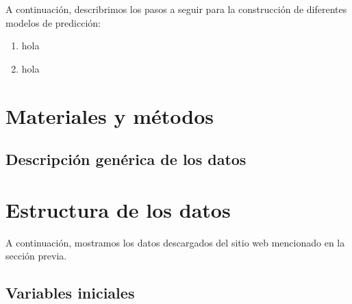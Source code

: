 \documentclass[
  letterpaper,
  DIV=11,
  numbers=noendperiod]{scrartcl}
\providecommand{\tightlist}{%
  \setlength{\itemsep}{0pt}\setlength{\parskip}{0pt}}\usepackage{longtable,booktabs,array}
\begin{document}
A continuación, describrimos los pasos a seguir para la construcción de
diferentes modelos de predicción:

\begin{enumerate}
\def\labelenumi{\arabic{enumi}.}
\tightlist
\item
  hola
\item
  hola
\end{enumerate}

\section{Materiales y métodos}\label{materiales-y-muxe9todos}

\subsection{Descripción genérica de los
datos}\label{descripciuxf3n-genuxe9rica-de-los-datos}

\section{Estructura de los datos}\label{estructura-de-los-datos}

A continuación, mostramos los datos descargados del sitio web mencionado
en la sección previa.

\subsection{Variables iniciales}\label{variables-iniciales}
\end{document}
